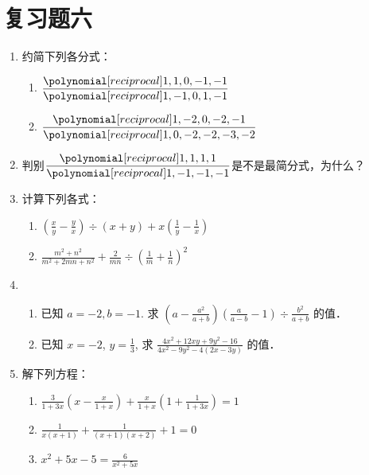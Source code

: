 \section*{复习题六}
\begin{enumerate}
    \item 约简下列各分式：
    \begin{multicols}{2}
\begin{enumerate}
    \item $\frac{\poly{1,1,0,-1,-1}}{\poly{1,-1,0,1,-1}}$
    \item $\frac{\poly{1,-2,0,-2,-1}}{\poly{1,0,-2,-2,-3,-2}}$
\end{enumerate}
\end{multicols}

\item 判别$\frac{\poly{1,1,1,1}}{\poly{1,-1,-1,-1}}$是不是最简分式，为什么？

\item 计算下列各式：
    \begin{enumerate}
    \item $\left(\frac{x}{y}-\frac{y}{x}\right) \div(x+y)+x\left(\frac{1}{y}-\frac{1}{x}\right)$
    \item $\frac{m^{2}+n^{2}}{m^{2}+2 m n+n^{2}}+\frac{2}{m n} \div\left(\frac{1}{m}+\frac{1}{n}\right)^{2}$
\end{enumerate}


\item \begin{enumerate}
    \item 已知 $a=-2, b=-1$. 求 $\left(a-\frac{a^{2}}{a+b}\right)\left(\frac{a}{a-b}-1\right)\div \frac{b^{2}}{a+b}$ 的值．
    \item 已知 $x=-2$, $y=\frac{1}{3}$, 求 $\frac{4 x^{2}+12 x y+9 y^{2}-16}{4 x^{2}-9 y^{2}-4(2 x-3 y)}$ 的值．
\end{enumerate}

\item 解下列方程：
\begin{enumerate}
    \item $\frac{3}{1+3 x}\left(x-\frac{x}{1+x}\right)+\frac{x}{1+x}\left(1+\frac{1}{1+3 x}\right)=1$
    \item $\frac{1}{x(x+1)}+\frac{1}{(x+1)(x+2)}+1=0$
    \item $x^{2}+5 x-5=\frac{6}{x^{2}+5 x}$
\end{enumerate}


\end{enumerate}
